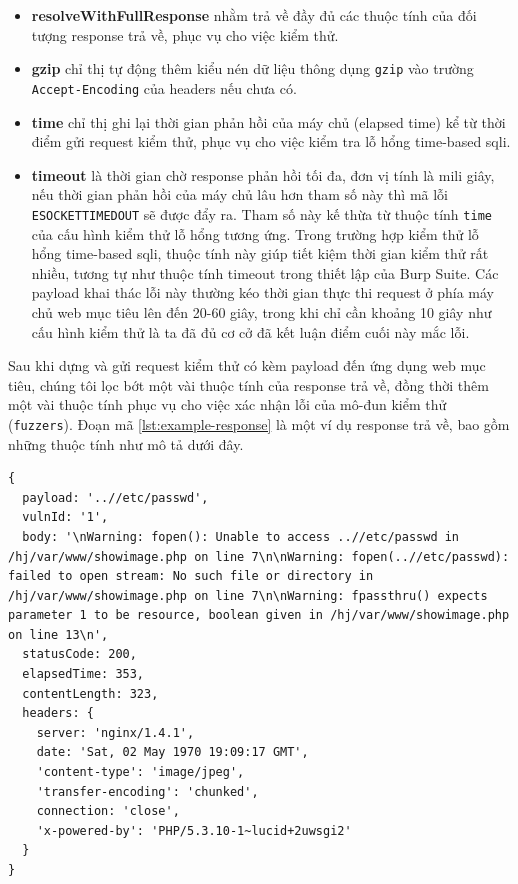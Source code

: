 \begin{itemize}
  \item \textbf{resolveWithFullResponse} nhằm trả về đầy đủ các thuộc tính của đối tượng response trả về, phục vụ cho việc kiểm thử.
  \item \textbf{gzip} chỉ thị tự động thêm kiểu nén dữ liệu thông dụng \texttt{gzip} vào trường \texttt{Accept-Encoding} của headers nếu chưa có.
  \item \textbf{time} chỉ thị ghi lại thời gian phản hồi của máy chủ (elapsed time) kể từ thời điểm gửi request kiểm thử, phục vụ cho việc kiểm tra lỗ hổng time-based \acrshort{sqli}.
  \item \textbf{timeout} là thời gian chờ response phản hồi tối đa, đơn vị tính là mili giây, nếu thời gian phản hồi của máy chủ lâu hơn tham số này thì mã lỗi \texttt{ESOCKETTIMEDOUT} sẽ được đẩy ra. Tham số này kế thừa từ thuộc tính \texttt{time} của cấu hình kiểm thử lỗ hổng tương ứng. Trong trường hợp kiểm thử lỗ hổng time-based \acrshort{sqli}, thuộc tính này giúp tiết kiệm thời gian kiểm thử rất nhiều, tương tự như thuộc tính timeout trong thiết lập của Burp Suite. Các payload khai thác lỗi này thường kéo thời gian thực thi request ở phía máy chủ web mục tiêu lên đến 20-60 giây, trong khi chỉ cần khoảng 10 giây như cấu hình kiểm thử là ta đã đủ cơ cở đã kết luận điểm cuối này mắc lỗi.
\end{itemize}
Sau khi dựng và gửi request kiểm thử có kèm payload đến ứng dụng web mục tiêu, chúng tôi lọc bớt một vài thuộc tính của response trả về, đồng thời thêm một vài thuộc tính phục vụ cho việc xác nhận lỗi của mô-đun kiểm thử (\texttt{fuzzers}). Đoạn mã \ref{lst:example-response} là một ví dụ response trả về, bao gồm những thuộc tính như mô tả dưới đây.
\begin{lstlisting}[style=ES6, label={lst:example-response}, caption={Ví dụ về response phản hồi từ ứng dụng web mục tiêu}]
{
  payload: '..//etc/passwd',
  vulnId: '1',
  body: '\nWarning: fopen(): Unable to access ..//etc/passwd in /hj/var/www/showimage.php on line 7\n\nWarning: fopen(..//etc/passwd): failed to open stream: No such file or directory in /hj/var/www/showimage.php on line 7\n\nWarning: fpassthru() expects parameter 1 to be resource, boolean given in /hj/var/www/showimage.php on line 13\n',
  statusCode: 200,
  elapsedTime: 353,
  contentLength: 323,
  headers: {
    server: 'nginx/1.4.1',
    date: 'Sat, 02 May 1970 19:09:17 GMT',
    'content-type': 'image/jpeg',
    'transfer-encoding': 'chunked',
    connection: 'close',
    'x-powered-by': 'PHP/5.3.10-1~lucid+2uwsgi2'
  }
}
\end{lstlisting}
